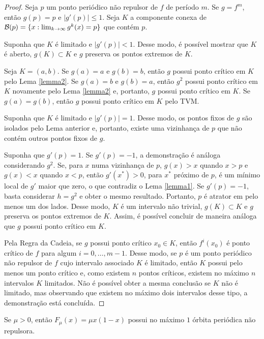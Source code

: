 \begin{proof}
Seja $p$ um ponto periódico não repulsor de $f$ de período $m$.
Se $g = f^m$, então $g(p) = p$ e $|g'(p)| \leq 1$. Seja $K$ a componente conexa de $\mathcal{B}(p) = \lbrace x : \lim_{k \to \infty} g^k(x) = p \rbrace$ que contém $p$.

Suponha que $K$ é limitado e $|g'(p)| < 1$.
Desse modo, é possível mostrar que $K$ é aberto, $g(K) \subset K$ e $g$ preserva os pontos extremos de $K$.

Seja $K = (a, b)$.
Se $g(a) = a$ e $g(b) = b$, então $g$ possui ponto crítico em $K$ pelo Lema \ref{lemma2}.
Se $g(a) = b$ e $g(b) = a$, então $g^2$ possui ponto crítico em $K$ novamente pelo Lema \ref{lemma2} e, portanto, $g$ possui ponto crítico em $K$.
Se $g(a) = g(b)$, então $g$ possui ponto crítico em $K$ pelo TVM.

Suponha que $K$ é limitado e $|g'(p)| = 1$. Desse modo, os pontos fixos de $g$ são isolados pelo Lema anterior e, portanto, existe uma vizinhança de $p$ que não contém outros pontos fixos de $g$.

Suponha que $g'(p) = 1$. Se $g'(p) = -1$, a demonstração é análoga considerando $g^2$. Se, para $x$ numa vizinhança de $p$, $g(x) > x$ quando $x > p$ e $g(x) < x$ quando $x < p$, então $g'(x^*) > 0$, para $x^*$ próximo de $p$, é um mínimo local de $g'$ maior que zero, o que contradiz o Lema \ref{lemma1}. Se $g'(p)=-1$, basta considerar $h=g^2$ e obter o mesmo resultado. Portanto, $p$ é atrator em pelo menos um dos lados. Desse modo, $K$ é um intervalo não trivial, $g(K) \subset K$ e $g$ preserva os pontos extremos de $K$. Assim, é possível concluir de maneira análoga que $g$ possui ponto crítico em $K$.

Pela Regra da Cadeia, se $g$ possui ponto crítico $x_0 \in K$, então $f^i(x_0)$ é ponto crítico de $f$ para algum $i = 0, \dots, m-1$. Desse modo, se $p$ é um ponto periódico não repulsor de $f$ cujo intervalo associado $K$ é limitado, então $K$ possui pelo menos um ponto crítico e, como existem $n$ pontos críticos, existem no máximo $n$ intervalos $K$ limitados. Não é possível obter a mesma conclusão se $K$ não é limitado, mas observando que existem no máximo dois intervalos desse tipo, a demonstração está concluída.
\end{proof}

\begin{corollary}
Se $\mu > 0$, então $F_\mu(x) = \mu x(1-x)$ possui no máximo $1$ órbita periódica não repulsora.
\end{corollary}
